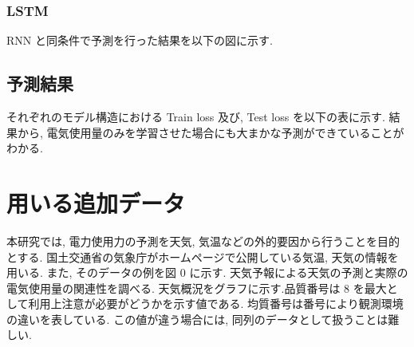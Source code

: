 \subsubsection{LSTM}
RNN と同条件で予測を行った結果を以下の図に示す.



\subsection{予測結果}
それぞれのモデル構造における Train loss 及び, Test loss を以下の表に示す.
結果から, 電気使用量のみを学習させた場合にも大まかな予測ができていることがわかる.


\section{用いる追加データ}
本研究では, 電力使用力の予測を天気, 気温などの外的要因から行うことを目的とする.
国土交通省の気象庁がホームページで公開している気温, 天気の情報を用いる.
また, そのデータの例を図 0 に示す. 天気予報による天気の予測と実際の電気使用量の関連性を調べる. 天気概況をグラフに示す.品質番号は 8 を最大として利用上注意が必要がどうかを示す値である. 均質番号は番号により観測環境の違いを表している. この値が違う場合には, 同列のデータとして扱うことは難しい. 

